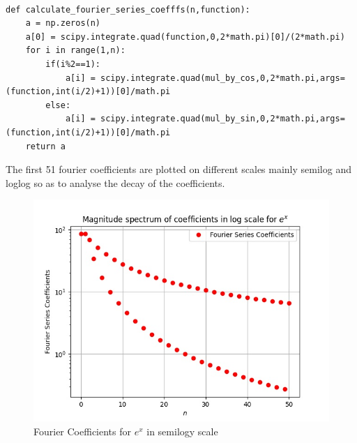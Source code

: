 \documentclass{article}
\begin{document}
\begin{lstlisting}

def calculate_fourier_series_coefffs(n,function):
    a = np.zeros(n)
    a[0] = scipy.integrate.quad(function,0,2*math.pi)[0]/(2*math.pi)
    for i in range(1,n):
        if(i%2==1):
            a[i] = scipy.integrate.quad(mul_by_cos,0,2*math.pi,args=(function,int(i/2)+1))[0]/math.pi
        else:
            a[i] = scipy.integrate.quad(mul_by_sin,0,2*math.pi,args=(function,int(i/2)+1))[0]/math.pi
    return a

\end{lstlisting}

 The first 51 fourier coefficients are plotted on different scales mainly semilog and loglog so as to analyse the decay of the coefficients.


\begin{figure}[!tbh]
    \centering
    \includegraphics[scale=0.65]{plots/Magnitude spectrum of coefficients in log scale for $e^x$.jpg}
    \caption{Fourier Coefficients for $e^x$ in semilogy scale}
    \label{fig:Figure 3}
    \end{figure}
\end{document}
